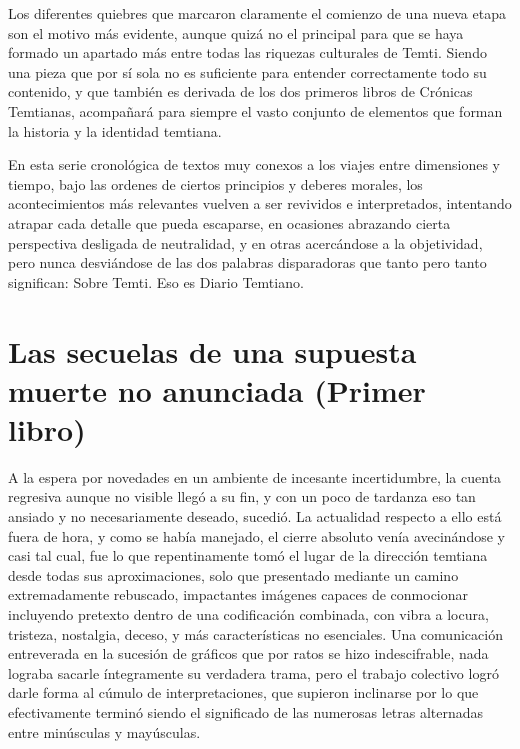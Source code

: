 \documentclass[
]{book}
\begin{document}
Los diferentes quiebres que marcaron claramente el comienzo de una nueva etapa son el motivo más evidente, aunque quizá no el principal para que se haya formado un apartado más entre todas las riquezas culturales de Temti. Siendo una pieza que por sí sola no es suficiente para entender correctamente todo su contenido, y que también es derivada de los dos primeros libros de Crónicas Temtianas, acompañará para siempre el vasto conjunto de elementos que forman la historia y la identidad temtiana.

En esta serie cronológica de textos muy conexos a los viajes entre dimensiones y tiempo, bajo las ordenes de ciertos principios y deberes morales, los acontecimientos más relevantes vuelven a ser revividos e interpretados, intentando atrapar cada detalle que pueda escaparse, en ocasiones abrazando cierta perspectiva desligada de neutralidad, y en otras acercándose a la objetividad, pero nunca desviándose de las dos palabras disparadoras que tanto pero tanto significan: Sobre Temti. Eso es Diario Temtiano.

\hypertarget{las-secuelas-de-una-supuesta-muerte-no-anunciada-primer-libro}{%
\chapter{Las secuelas de una supuesta muerte no anunciada (Primer libro)}\label{las-secuelas-de-una-supuesta-muerte-no-anunciada-primer-libro}}

A la espera por novedades en un ambiente de incesante incertidumbre, la cuenta regresiva aunque no visible llegó a su fin, y con un poco de tardanza eso tan ansiado y no necesariamente deseado, sucedió. La actualidad respecto a ello está fuera de hora, y como se había manejado, el cierre absoluto venía avecinándose y casi tal cual, fue lo que repentinamente tomó el lugar de la dirección temtiana desde todas sus aproximaciones, solo que presentado mediante un camino extremadamente rebuscado, impactantes imágenes capaces de conmocionar incluyendo pretexto dentro de una codificación combinada, con vibra a locura, tristeza, nostalgia, deceso, y más características no esenciales. Una comunicación entreverada en la sucesión de gráficos que por ratos se hizo indescifrable, nada lograba sacarle íntegramente su verdadera trama, pero el trabajo colectivo logró darle forma al cúmulo de interpretaciones, que supieron inclinarse por lo que efectivamente terminó siendo el significado de las numerosas letras alternadas entre minúsculas y mayúsculas.
\end{document}
